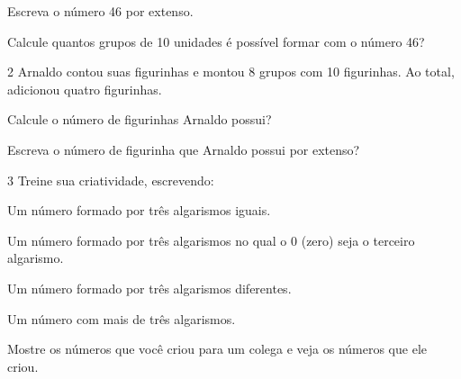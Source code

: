 \begin{escolha}
\item  Escreva o número 46 por extenso.

\item Calcule quantos grupos de 10 unidades é possível formar com o número 46?
\end{escolha}

\num{2} Arnaldo contou suas figurinhas e montou 8 grupos com 10 figurinhas. Ao total, adicionou quatro figurinhas.

\begin{escolha}
\item
  Calcule o número de figurinhas Arnaldo possui?\\

\item  Escreva o número de figurinha que Arnaldo possui por extenso?\\
\end{escolha}

\num{3} Treine sua criatividade, escrevendo:

\begin{escolha}
\item Um número formado por três algarismos iguais.\\

\item Um número formado por três algarismos no qual o 0 (zero) seja o terceiro algarismo.\\

\item Um número formado por três algarismos diferentes.\\

\item Um número com mais de três algarismos.\\

\item Mostre os números que você criou para um colega e veja os números que ele criou.
\end{escolha}

